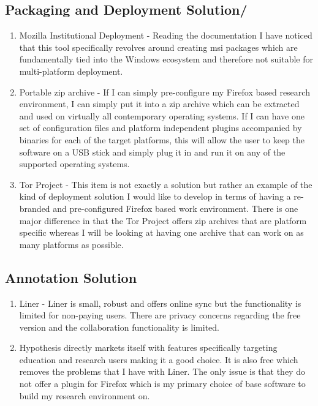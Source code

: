 \documentclass{article}
\begin{document}
\subsection{Packaging and Deployment Solution/}
\begin{enumerate}
    \item Mozilla Institutional Deployment - Reading the documentation I have noticed that this tool specifically revolves around creating msi packages which are fundamentally tied into the Windows ecosystem and therefore not suitable for multi-platform deployment.
    \item Portable zip archive - If I can simply pre-configure my Firefox based research environment, I can simply put it into a zip archive which can be extracted and used on virtually all contemporary operating systems. If I can have one set of configuration files and platform independent plugins accompanied by binaries for each of the target platforms, this will allow the user to keep the software on a USB stick and simply plug it in and run it on any of the supported operating systems.
    \item Tor Project - This item is not exactly a solution but rather an example of the kind of deployment solution I would like to develop in terms of having a re-branded and pre-configured Firefox based work environment. There is one major difference in that the Tor Project offers zip archives that are platform specific whereas I will be looking at having one archive that can work on as many platforms as possible.
\end{enumerate}
\subsection{Annotation Solution}
\begin{enumerate}
    \item Liner - Liner is small, robust and offers online sync but the functionality is limited for non-paying users. There are privacy concerns regarding the free version and the collaboration functionality is limited.
    \item Hypothesis directly markets itself with features specifically targeting education and research users making it a good choice. It is also free which removes the problems that I have with Liner. The only issue is that they do not offer a plugin for Firefox which is my primary choice of base software to build my research environment on.
\end{enumerate}
\end{document}
